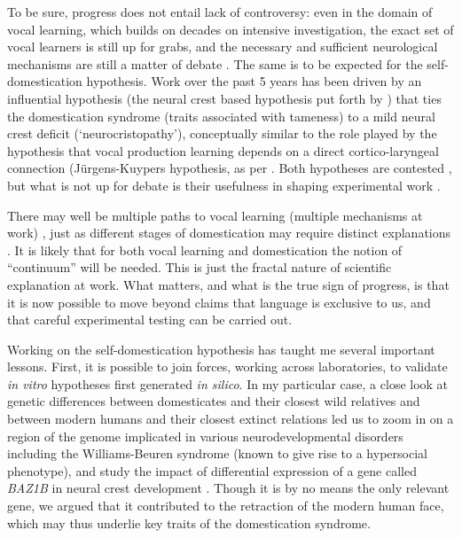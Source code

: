 To be sure, progress does not entail lack of controversy: even in the domain of vocal learning, which builds on decades on intensive investigation, the exact set of vocal learners is still up for grabs, and the necessary and sufficient neurological mechanisms are still a matter of debate \citep{martins2020vocal}. The same is to be expected for the self-domestication hypothesis. Work over the past 5 years has been driven by an influential hypothesis (the neural crest based hypothesis put forth by \cite{wilkins2014domestication}) that ties the domestication syndrome (traits associated with tameness) to a mild neural crest deficit (`neurocristopathy'), conceptually similar to the role played by the hypothesis that vocal production learning depends on a direct cortico-laryngeal connection (J\"{u}rgens-Kuypers hypothesis, as per \cite{fitch2010evolution}. Both hypotheses are contested \citep{lord2020history,johnsson2021neural,lameira2017bidding}, but what is not up for debate is their usefulness in shaping experimental work \citep{pfenning2014convergent,zanella2019dosage,wilkins2021neural}. 

There may well be multiple paths to vocal learning
(multiple mechanisms at work) \citep{martins2020vocal,wirthlin2019modular}, just as different stages of domestication may require distinct explanations \citep{o2020glutamate}. It is likely that for both vocal learning and domestication the notion of ``continuum'' will be needed. This is just the fractal nature of scientific explanation at work. What matters, and what is the true sign of progress, is that it is now possible to move beyond claims that language is exclusive to us, and that careful experimental testing can be carried out.

Working on the self-domestication hypothesis has taught me several important lessons. First, it is possible to join forces, working across laboratories, to validate \textit{in vitro} hypotheses first generated \textit{in silico}. In my particular case, a close look at genetic differences between domesticates and their closest wild relatives \citep{theofanopoulou2017self} and between modern humans and their closest extinct relations \citep{kuhlwilm2019catalog} led us to zoom in on a region of the genome implicated in various neurodevelopmental disorders including the Williams-Beuren syndrome (known to give rise to a hypersocial phenotype), and study the impact of differential expression of a gene called \textit{BAZ1B} in neural crest development \citep{zanella2019dosage}. Though it is by no means the only relevant gene, we argued that it contributed to the retraction of the modern human face, which may thus underlie key traits of the domestication syndrome. 

